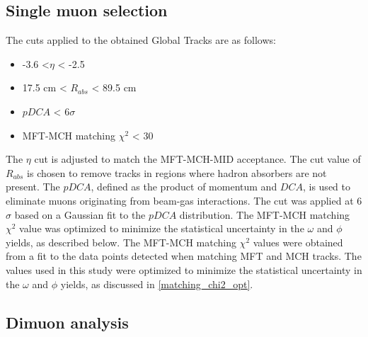     \subsection{Single muon selection}
    \label{Single_muon_selection}
        The cuts applied to the obtained Global Tracks are as follows:
        \begin{itemize}{}
            \item -3.6 <$\eta$ < -2.5
            \item 17.5 cm < $R_{abs}$ < 89.5 cm
            \item $pDCA$ < 6$\sigma$
            \item MFT-MCH matching $\chi^2$ < 30
        \end{itemize}
        The $\eta$ cut is adjusted to match the MFT-MCH-MID acceptance. The cut value of $R_{abs}$ is chosen to remove tracks in regions where hadron absorbers are not present. The $pDCA$, defined as the product of momentum and $DCA$, is used to eliminate muons originating from beam-gas interactions. The cut was applied at 6$\sigma$ based on a Gaussian fit to the $pDCA$ distribution. The MFT-MCH matching $\chi^2$ value was optimized to minimize the statistical uncertainty in the $\omega$ and $\phi$ yields, as described below. The MFT-MCH matching $\chi^2$ values were obtained from a fit to the data points detected when matching MFT and MCH tracks. The values used in this study were optimized to minimize the statistical uncertainty in the $\omega$ and $\phi$ yields, as discussed in \ref{matching_chi2_opt}.
    
        \subsection{Dimuon analysis}
        \label{Dimuon}
